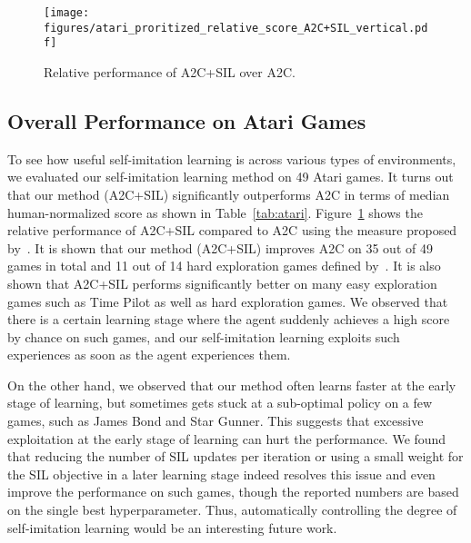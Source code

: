 \documentclass{article}
\newcommand{\cutsubsectionup}{\vspace*{-0.05in}}\newcommand{\cutsubsectiondown}{\vspace*{-0.05in}}
\begin{document}
\begin{figure}
	\centering
	\texttt{[image: figures/atari\_proritized\_relative\_score\_A2C+SIL\_vertical.pdf]}
	\vskip -0.1in
	\caption{Relative performance of A2C+SIL over A2C.}
	\label{fig:relative}
	\vskip -0.1in
\end{figure}



\cutsubsectionup
\subsection{Overall Performance on Atari Games} \label{sec:exp-overall}
\cutsubsectiondown
To see how useful self-imitation learning is across various types of environments, we evaluated our self-imitation learning method on 49 Atari games. It turns out that our method (A2C+SIL) significantly outperforms A2C in terms of median human-normalized score as shown in Table~\ref{tab:atari}. Figure~\ref{fig:relative} shows the relative performance of A2C+SIL compared to A2C using the measure proposed by~\citet{Wang2016DuelingNA}.
It is shown that our method (A2C+SIL) improves A2C on 35 out of 49 games in total and 11 out of 14 hard exploration games defined by~\citet{bellemare2016unifying}. It is also shown that A2C+SIL performs significantly better on many easy exploration games such as Time Pilot as well as hard exploration games. We observed that there is a certain learning stage where the agent suddenly achieves a high score by chance on such games, and our self-imitation learning exploits such experiences as soon as the agent experiences them.

On the other hand, we observed that our method often learns faster at the early stage of learning, but sometimes gets stuck at a sub-optimal policy on a few games, such as James Bond and Star Gunner. This suggests that excessive exploitation at the early stage of learning can hurt the performance. We found that reducing the number of SIL updates per iteration or using a small weight for the SIL objective in a later learning stage indeed resolves this issue and even improve the performance on such games, though the reported numbers are based on the single best hyperparameter. Thus, automatically controlling the degree of self-imitation learning would be an interesting future work.
\end{document}
